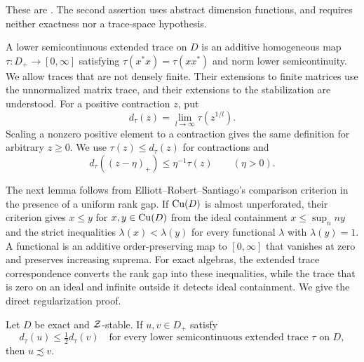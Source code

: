 These are \cite[Theorem~4.5 and Corollary~4.7]{Rordam}.  The second
assertion uses abstract dimension functions, and requires neither
exactness nor a trace-space hypothesis.

A lower semicontinuous extended trace on $D$ is an additive homogeneous
map $\tau:D_+\to[0,\infty]$ satisfying
$\tau(x^*x)=\tau(xx^*)$ and norm lower semicontinuity.
We allow traces that are not densely finite.  Their extensions to finite
matrices use the unnormalized matrix trace, and their extensions to the
stabilization are understood.  For a positive contraction $z$, put
\[
 d_\tau(z)=\lim_{l\to\infty}\tau(z^{1/l}).
\]
Scaling a nonzero positive element to a contraction gives the same
definition for arbitrary $z\ge0$.  We use
$\tau(z)\le d_\tau(z)$ for contractions and
\begin{equation}
 \label{prelim:trace-cut}
 d_\tau((z-\eta)_+)\le\eta^{-1}\tau(z)\qquad(\eta>0).
\end{equation}

The next lemma follows from Elliott--Robert--Santiago's comparison
criterion \cite[Proposition~6.2]{ERS} in the presence of a uniform rank
gap.  If $\mathrm{Cu}(D)$ is almost unperforated, their criterion gives
$x\le y$ for $x,y\in\mathrm{Cu}(D)$ from the ideal containment
$x\le\sup_n ny$ and the strict inequalities
$\lambda(x)<\lambda(y)$ for every functional $\lambda$ with
$\lambda(y)=1$.  A functional is an additive order-preserving map to
$[0,\infty]$ that vanishes at zero and preserves increasing suprema.
For exact algebras, the extended trace correspondence converts the rank
gap into these inequalities, while the trace that is zero on an ideal
and infinite outside it detects ideal containment.  We give the direct
regularization proof.

\begin{lemma}
\label{prelim:half-comparison}
Let $D$ be exact and $\mathcal Z$-stable.  If $u,v\in D_+$ satisfy
\[
 d_\tau(u)\le\tfrac12d_\tau(v)
 \quad\text{for every lower semicontinuous extended trace $\tau$ on $D$},
\]
then $u\precsim v$.
\end{lemma}

